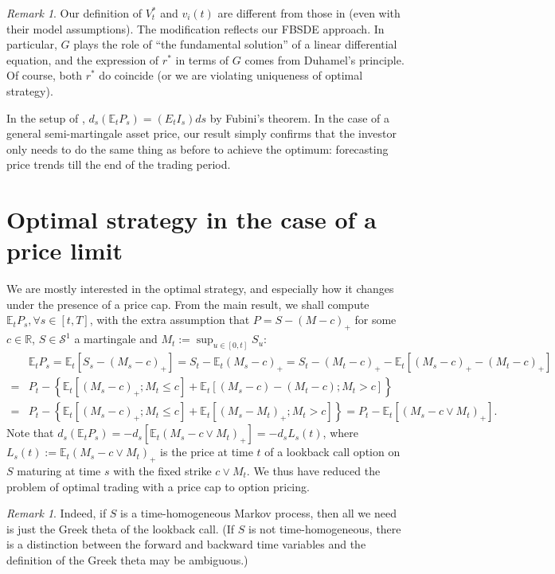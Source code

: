 \documentclass[openany,oneside]{article}
\theoremstyle{definition}
\theoremstyle{remark}
\newtheorem{rem}[thm]{Remark}
\newcommand{\E}{\mathbb{E}} %
\begin{document}
\begin{rem}
Our definition of $V^\ast_t$ and $v_i(t)$ are different from those in \cite{lehalle2017incorporating} (even with their model assumptions). The modification reflects our FBSDE approach. In particular, $G$ plays the role of ``the fundamental solution'' of a linear differential equation, and the expression of $r^\ast$ in terms of $G$ comes from Duhamel's principle. Of course, both $r^\ast$ do coincide (or we are violating uniqueness of optimal strategy).

In the setup of \cite{lehalle2017incorporating}, $d_s(\E_t P_s) = (E_t I_s)ds$ by Fubini's theorem. In the case of a general semi-martingale asset price, our result simply confirms that the investor only needs to do the same thing as before to achieve the optimum: forecasting price trends till the end of the trading period.
\end{rem}



\section{Optimal strategy in the case of a price limit}
We are mostly interested in the optimal strategy, and especially how it changes under the presence of a price cap. From the main result, we shall compute $\E_t P_s, \forall s\in[t,T]$, with the extra assumption that $P=S-(M-c)_+$ for some $c\in\mathbb{R}$, $S\in\mathcal{S}^1$ a martingale and $M_t:=\sup_{u\in[0,t]}S_u$:
\begin{align*}
& \E_t P_s = \E_t[S_s-(M_s-c)_+] = S_t-\E_t(M_s-c)_+ = S_t-(M_t-c)_+ - \E_t\left[(M_s-c)_+ - (M_t-c)_+\right] \\
=& P_t -\left\{ \E_t\left[(M_s-c)_+; M_t\le c\right] + \E_t\left[(M_s-c)-(M_t-c); M_t > c\right] \right\} \\
=& P_t -\left\{ \E_t\left[(M_s-c)_+; M_t\le c\right] + \E_t\left[(M_s-M_t)_+; M_t > c\right] \right\} = P_t - \E_t\left[(M_s-c\vee M_t)_+\right].
\end{align*}
Note that $d_s(\E_t P_s) = -d_s\left[\E_t(M_s-c\vee M_t)_+\right] = -d_s L_s(t)$, where $L_s(t):=\E_t(M_s-c\vee M_t)_+$ is the price at time $t$ of a lookback call option on $S$ maturing at time $s$ with the fixed strike $c\vee M_t$. We thus have reduced the problem of optimal trading with a price cap to option pricing.

\begin{rem}
Indeed, if $S$ is a time-homogeneous Markov process, then all we need is just the Greek theta of the lookback call. (If $S$ is not time-homogeneous, there is a distinction between the forward and backward time variables and the definition of the Greek theta may be ambiguous.)
\end{rem}
\end{document}
